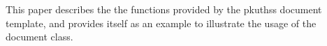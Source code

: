 ﻿%
%

\begin{cabstract}
\end{cabstract}

\begin{eabstract}

	This paper describes the the functions provided by
	the pkuthss document template,
	and provides itself as an example to illustrate
	the usage of the document class.

\end{eabstract}

